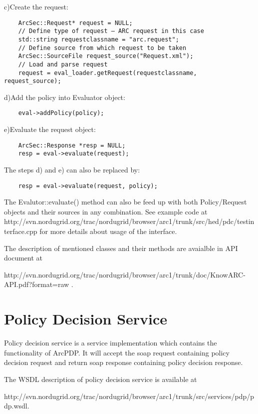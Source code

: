 \documentclass{book}
\begin{document}
c)Create the request:
\begin{verbatim}
    ArcSec::Request* request = NULL;
    // Define type of request – ARC request in this case
    std::string requestclassname = "arc.request";
    // Define source from which request to be taken
    ArcSec::SourceFile request_source("Request.xml");
    // Load and parse request
    request = eval_loader.getRequest(requestclassname, request_source);
\end{verbatim}

d)Add the policy into Evaluator object:
\begin{verbatim}
    eval->addPolicy(policy);
\end{verbatim}

e)Evaluate the request object:
\begin{verbatim}
    ArcSec::Response *resp = NULL;
    resp = eval->evaluate(request);
\end{verbatim}

The steps d) and e) can also be replaced by:

\begin{verbatim}
    resp = eval->evaluate(request, policy);
\end{verbatim}

The Evalutor::evaluate() method can also be feed up with both Policy/Request objects and their sources in any combination. See example code at http://svn.nordugrid.org/trac/nordugrid/browser/arc1/trunk/src/hed/pdc/testinterface.cpp for more details about usage of the interface.

The description of mentioned classes and their methods are avaialble in  API document at

http://svn.nordugrid.org/trac/nordugrid/browser/arc1/trunk/doc/KnowARC-API.pdf?format=raw .


\section{Policy Decision Service} %
\label{sec:policy_decision_service}
Policy decision service is a service implementation which contains the functionality of ArcPDP. It will accept the soap request containing policy decision request and return soap response containing policy decision response.

The WSDL description of policy decision service is available at

 http://svn.nordugrid.org/trac/nordugrid/browser/arc1/trunk/src/services/pdp/pdp.wsdl. 
\end{document}
